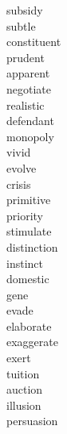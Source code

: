 \documentclass[a4paper, 10pt]{ctexart}
\begin{document}
\begin{multicols*}{2}
\begin{description}
\item[subsidy]

\item[subtle]

\item[constituent]

\item[prudent]

\item[apparent]

\item[negotiate]

\item[realistic]

\item[defendant]

\item[monopoly]

\item[vivid]

\item[evolve]

\item[crisis]

\item[primitive]

\item[priority]

\item[stimulate]

\item[distinction]

\item[instinct]

\item[domestic]

\item[gene]

\item[evade]

\item[elaborate]

\item[exaggerate]

\item[exert]

\item[tuition]

\item[auction]

\item[illusion]

\item[persuasion]


\end{description}
\end{multicols*}
\end{document}
